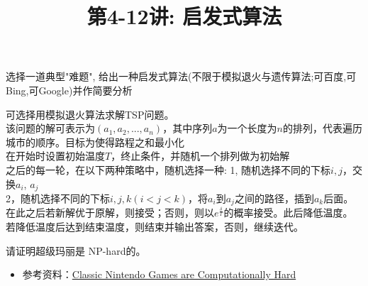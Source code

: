\documentclass[a4paper, justified]{tufte-handout}
\title{第4-12讲: 启发式算法}
\date{\zhtoday} %
\begin{document}
\maketitle
\noplagiarism %
\begin{abstract}
\end{abstract}
\beginrequired

\begin{problem}[探索题]
选择一道典型"难题", 给出一种启发式算法(不限于模拟退火与遗传算法;可百度,可Bing,可Google)并作简要分析
\end{problem}

\begin{solution}
	可选择用模拟退火算法求解TSP问题。\\
	该问题的解可表示为$(a_1, a_2, ..., a_n)$，其中序列$a$为一个长度为$n$的排列，代表遍历城市的顺序。目标为使得路程之和最小化\\
	在开始时设置初始温度$T$，终止条件，并随机一个排列做为初始解\\
	之后的每一轮，在以下两种策略中，随机选择一种:
	1,  随机选择不同的下标$i,j$，交换$a_i$, $a_j$\\
	2，随机选择不同的下标$i,j,k(i < j <k)$，将$a_i$到$a_j$之间的路径，插到$a_k$后面。\\
	在此之后若新解优于原解，则接受；否则，则以$e^{\frac{\delta}{T}}$的概率接受。此后降低温度。\\
	若降低温度后达到结束温度，则结束并输出答案，否则，继续迭代。
\end{solution}
\simeq


\beginoptional


\beginot
\begin{ot}
	请证明超级玛丽是 NP-hard的。
	\begin{itemize}
		\item 参考资料：\href{http://cslabcms.nju.edu.cn/problem_solving/images/e/e0/Classic_Nintendo_Games_are_Computationally_Hard_\%28arXiv12_1203.1895\%29.pdf}{Classic Nintendo Games are Computationally Hard}
	\end{itemize}
\end{ot}
\end{document}
